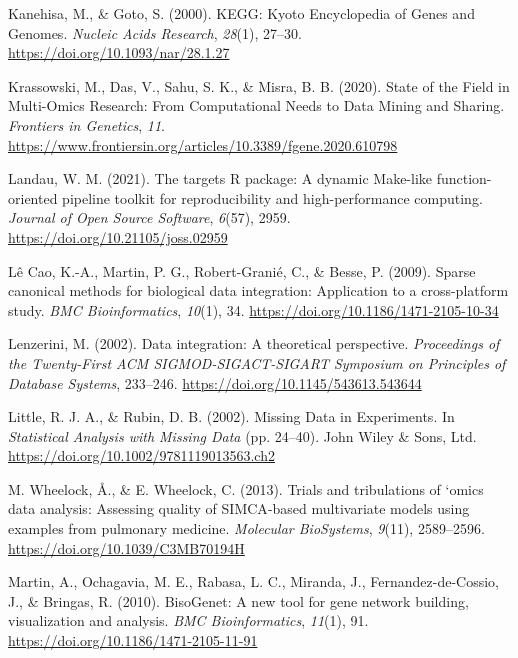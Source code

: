 \documentclass[a4paper, nobind]{templates/ociamthesis}
\newlength{\cslhangindent}
\newenvironment{CSLReferences}[2] %
 {%
  \setlength{\parindent}{0pt}
  \ifodd #1
  \let\oldpar\par
  \def\par{\hangindent=\cslhangindent\oldpar}
  \fi
  \setlength{\parskip}{1mm}
  \setlength{\baselineskip}{6mm}
 }%
 {}
\begin{document}
\begin{CSLReferences}{1}{0}
\leavevmode{}%
Kanehisa, M., \& Goto, S. (2000). {KEGG}: {Kyoto} {Encyclopedia} of {Genes} and {Genomes}. \emph{Nucleic Acids Research}, \emph{28}(1), 27--30. \url{https://doi.org/10.1093/nar/28.1.27}

\leavevmode{}%
Krassowski, M., Das, V., Sahu, S. K., \& Misra, B. B. (2020). State of the {Field} in {Multi}-{Omics} {Research}: {From} {Computational} {Needs} to {Data} {Mining} and {Sharing}. \emph{Frontiers in Genetics}, \emph{11}. \url{https://www.frontiersin.org/articles/10.3389/fgene.2020.610798}

\leavevmode{}%
Landau, W. M. (2021). The targets {R} package: A dynamic {Make}-like function-oriented pipeline toolkit for reproducibility and high-performance computing. \emph{Journal of Open Source Software}, \emph{6}(57), 2959. \url{https://doi.org/10.21105/joss.02959}

\leavevmode{}%
Lê Cao, K.-A., Martin, P. G., Robert-Granié, C., \& Besse, P. (2009). Sparse canonical methods for biological data integration: Application to a cross-platform study. \emph{BMC Bioinformatics}, \emph{10}(1), 34. \url{https://doi.org/10.1186/1471-2105-10-34}

\leavevmode{}%
Lenzerini, M. (2002). Data integration: A theoretical perspective. \emph{Proceedings of the Twenty-First {ACM} {SIGMOD}-{SIGACT}-{SIGART} Symposium on {Principles} of Database Systems}, 233--246. \url{https://doi.org/10.1145/543613.543644}

\leavevmode{}%
Little, R. J. A., \& Rubin, D. B. (2002). Missing {Data} in {Experiments}. In \emph{Statistical {Analysis} with {Missing} {Data}} (pp. 24--40). John Wiley \& Sons, Ltd. \url{https://doi.org/10.1002/9781119013563.ch2}

\leavevmode{}%
M. Wheelock, Å., \& E. Wheelock, C. (2013). Trials and tribulations of `omics data analysis: Assessing quality of {SIMCA}-based multivariate models using examples from pulmonary medicine. \emph{Molecular BioSystems}, \emph{9}(11), 2589--2596. \url{https://doi.org/10.1039/C3MB70194H}

\leavevmode{}%
Martin, A., Ochagavia, M. E., Rabasa, L. C., Miranda, J., Fernandez-de-Cossio, J., \& Bringas, R. (2010). {BisoGenet}: A new tool for gene network building, visualization and analysis. \emph{BMC Bioinformatics}, \emph{11}(1), 91. \url{https://doi.org/10.1186/1471-2105-11-91}


\end{CSLReferences}
\end{document}
